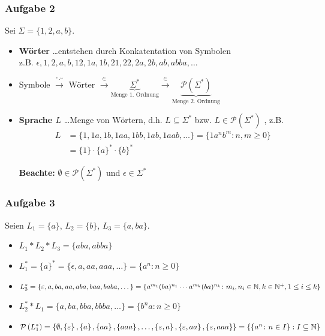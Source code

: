 \documentclass{beamer}
\begin{document}
\begin{frame} \frametitle{Aufgabe 2}
	Sei $\Sigma = \{1,2,a,b\}$. \pause
	\begin{itemize}[leftmargin=*]
		\item \textbf{Wörter}
		\dots entstehen durch Konkatentation von Symbolen \\
		z.B. $\epsilon, 1, 2, a,b,12,1a,1b,21,22,2a,2b,ab,abba,\dots$
		\pause
		\item Symbole $\overset{\text{''}\cdot\text{``}}{\longrightarrow}$ Wörter $\overset{\in}{\longrightarrow} \underbrace{\Sigma^\ast}_{\text{Menge 1. Ordnung}} \overset{\in}{\longrightarrow} \underbrace{\mathcal{P}(\Sigma^\ast)}_{\text{Menge 2. Ordnung}}$
		\pause
		\item \textbf{Sprache $L$}
		\dots Menge von Wörtern, d.h. $L \subseteq \Sigma^\ast$ bzw. $L \in \mathcal{P}(\Sigma^\ast)$ , z.B.
		\begin{equation*}
		\begin{aligned}
		L &= \{1,1a,1b,1aa,1bb,1ab,1aab, \dots \} 
		= \{1 a^n b^m \colon n,m \ge 0 \} \\
		&= \{1\} \cdot \{a\}^\ast \cdot \{b\}^\ast
		\end{aligned}
		\end{equation*}
		
		\textbf{Beachte:} $\emptyset \in \mathcal{P}(\Sigma^\ast)$ und $\epsilon \in \Sigma^\ast$
	\end{itemize}
	
\end{frame}

\begin{frame} \frametitle{Aufgabe 3}
	Seien $L_1 = \{a\}$, $L_2 = \{b\}$, $L_3 = \{a,ba\}$.
	\pause
	
	\begin{itemize}[leftmargin=*]
		\item $L_1 * L_2 * L_3 = \{aba,abba\}$
		\item $L_1^\ast = \{a\}^\ast = \{\epsilon,a,aa,aaa, \dots\} = \{a^n \colon n \ge 0\}$
	 	\item $L_3^\ast = \{\varepsilon, a,ba,aa,aba,baa,baba,\dots\} = \{a^{m_1}(ba)^{n_1} \cdots a^{m_k}(ba)^{n_k} \colon m_i, n_i \in \mathbb{N}, k \in \mathbb{N}^+, 1 \le i \le k\}$
	 	\item $L_2^\ast * L_1 = \{a,ba,bba,bbba,\dots\} = \{b^n a \colon n \ge 0\}$
	 	\item $\mathcal{P}\left( L_1^\ast \right) = \left\{ \emptyset, \left\{ \varepsilon \right\}, \left\{ a \right\}, \left\{ aa \right\}, \left\{ aaa \right\}, \dots , \left\{ \varepsilon, a \right\}, \left\{ \varepsilon,aa \right\}, \left\{ \varepsilon,aaa \right\} \right\} = \left\{ \left\{ a^n \colon n \in I \right\} : I \subseteq \mathbb{N} \right\}$
	\end{itemize}
\end{frame}
\end{document}
